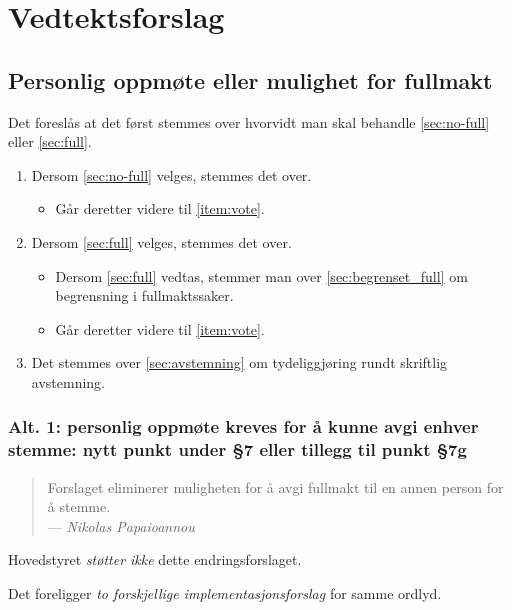 \documentclass[10pt,norsk,a4paper]{article}
\begin{document}
\newpage

\section{Vedtektsforslag}

\subsection{Personlig oppmøte eller mulighet for fullmakt}

Det foreslås at det først stemmes over hvorvidt man skal behandle \cref{sec:no-full} eller \cref{sec:full}. 

\begin{enumerate}
	\item Dersom \cref{sec:no-full} velges, stemmes det over.
		\begin{itemize}
			\item Går deretter videre til \cref{item:vote}.
		\end{itemize}
	\item Dersom \cref{sec:full} velges, stemmes det over.
		\begin{itemize}
			\item Dersom \cref{sec:full} vedtas, stemmer man over \cref{sec:begrenset_full} om begrensning i fullmaktssaker.
			\item Går deretter videre til \cref{item:vote}.
		\end{itemize}
	\item Det stemmes over \cref{sec:avstemning} om tydeliggjøring rundt skriftlig avstemning.\label{item:vote}
\end{enumerate}

\subsubsection{Alt. 1: personlig oppmøte kreves for å kunne avgi enhver stemme:
               nytt punkt under §7 eller tillegg til punkt §7g\label{sec:no-full}}
\begin{quote}
	Forslaget eliminerer muligheten for å avgi fullmakt til en annen person for å stemme.\\
	--- \emph{Nikolas Papaioannou}
\end{quote}

Hovedstyret \emph{støtter ikke} dette endringsforslaget.

Det foreligger \emph{to forskjellige implementasjonsforslag} for samme ordlyd.
\end{document}
